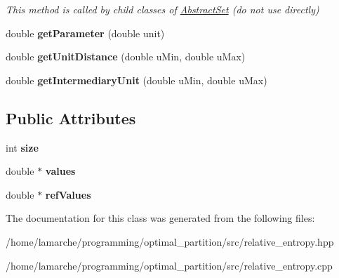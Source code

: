 \begin{DoxyCompactItemize}
\begin{DoxyCompactList}\small\item\em This method is called by child classes of \hyperlink{classAbstractSet}{Abstract\-Set} (do not use directly) \end{DoxyCompactList}\item 
\hypertarget{classRelativeEntropy_ac021b7887e7ccb9d23a865ab3cdb0704}{double {\bfseries get\-Parameter} (double unit)}\label{classRelativeEntropy_ac021b7887e7ccb9d23a865ab3cdb0704}

\item 
\hypertarget{classRelativeEntropy_ab2173fffca585fc30bfe66ae2b3fd06a}{double {\bfseries get\-Unit\-Distance} (double u\-Min, double u\-Max)}\label{classRelativeEntropy_ab2173fffca585fc30bfe66ae2b3fd06a}

\item 
\hypertarget{classRelativeEntropy_a92c8e2ced62582fcd1dec801cedee04f}{double {\bfseries get\-Intermediary\-Unit} (double u\-Min, double u\-Max)}\label{classRelativeEntropy_a92c8e2ced62582fcd1dec801cedee04f}

\end{DoxyCompactItemize}
\subsection*{Public Attributes}
\begin{DoxyCompactItemize}
\item 
\hypertarget{classRelativeEntropy_a684e97eedbf983c173161693dbf89836}{int {\bfseries size}}\label{classRelativeEntropy_a684e97eedbf983c173161693dbf89836}

\item 
\hypertarget{classRelativeEntropy_abf8732d75d92b5e43deafba0b7a4d262}{double $\ast$ {\bfseries values}}\label{classRelativeEntropy_abf8732d75d92b5e43deafba0b7a4d262}

\item 
\hypertarget{classRelativeEntropy_a31d0f68b5478c06f9935e523c34e0df1}{double $\ast$ {\bfseries ref\-Values}}\label{classRelativeEntropy_a31d0f68b5478c06f9935e523c34e0df1}

\end{DoxyCompactItemize}


The documentation for this class was generated from the following files\-:\begin{DoxyCompactItemize}
\item 
/home/lamarche/programming/optimal\-\_\-partition/src/relative\-\_\-entropy.\-hpp\item 
/home/lamarche/programming/optimal\-\_\-partition/src/relative\-\_\-entropy.\-cpp\end{DoxyCompactItemize}
